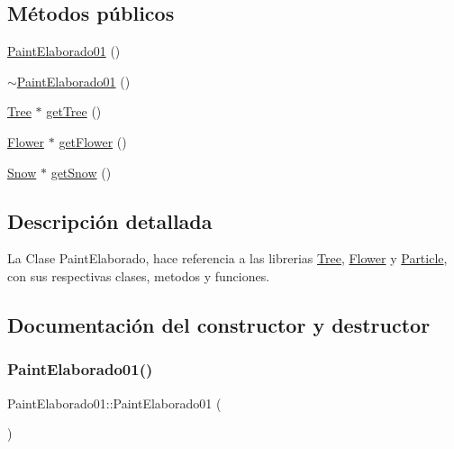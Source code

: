 \subsection*{Métodos públicos}
\begin{DoxyCompactItemize}
\item 
\mbox{\hyperlink{class_paint_elaborado01_a942b4fe89f415477ad49ac9372122eb9}{Paint\+Elaborado01}} ()
\item 
\mbox{\hyperlink{class_paint_elaborado01_acb3937eeb7962dabab4add6d670c3a72}{$\sim$\+Paint\+Elaborado01}} ()
\item 
\mbox{\hyperlink{class_tree}{Tree}} $\ast$ \mbox{\hyperlink{class_paint_elaborado01_a1b6bce9b1cd0bf093eff083e1c2e05f9}{get\+Tree}} ()
\item 
\mbox{\hyperlink{class_flower}{Flower}} $\ast$ \mbox{\hyperlink{class_paint_elaborado01_af3cbb01b8c86f74467c83521548b6311}{get\+Flower}} ()
\item 
\mbox{\hyperlink{class_snow}{Snow}} $\ast$ \mbox{\hyperlink{class_paint_elaborado01_a0c42906a02e9f8081521dd7706f63e0f}{get\+Snow}} ()
\end{DoxyCompactItemize}


\subsection{Descripción detallada}
La Clase Paint\+Elaborado, hace referencia a las librerias \mbox{\hyperlink{class_tree}{Tree}}, \mbox{\hyperlink{class_flower}{Flower}} y \mbox{\hyperlink{class_particle}{Particle}}, con sus respectivas clases, metodos y funciones. 

\subsection{Documentación del constructor y destructor}
\mbox{\label{class_paint_elaborado01_a942b4fe89f415477ad49ac9372122eb9}} 
\subsubsection{\texorpdfstring{PaintElaborado01()}{PaintElaborado01()}}
{\footnotesize\ttfamily Paint\+Elaborado01\+::\+Paint\+Elaborado01 (\begin{DoxyParamCaption}{ }\end{DoxyParamCaption})\hspace{0.3cm}{\ttfamily [inline]}}

